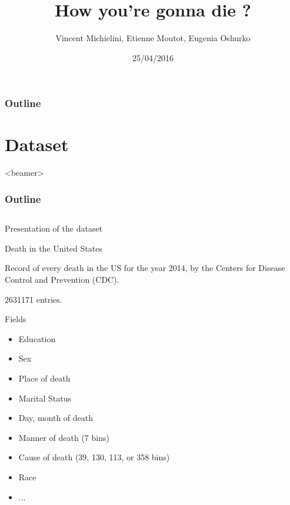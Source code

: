 \documentclass[xcolor=table]{beamer}
\title{How you're gonna die ?}
\author{Vincent Michielini, Etienne Moutot, Eugenia Oshurko}
\date{25/04/2016}
\begin{document}
\begin{frame}
\maketitle
\end{frame}

\begin{frame}
  \frametitle{Outline}
  \tableofcontents
\end{frame}

\section{Dataset}
{
     \begin{frame}<beamer>
     \frametitle{Outline}
     \tableofcontents[currentsection]
     \end{frame}
}

\subsection{}
\begin{frame}{Presentation of the dataset}
  \begin{center}
  {\Large Death in the United States}
  \end{center}
  
  \bigskip
  
  Record of every death in the US for the year 2014, by the  Centers for Disease Control and Prevention (CDC).
  
  \medskip
  
  2631171 entries.
\end{frame}

\begin{frame}{Fields}
  \begin{itemize}
    \item Education
    \item Sex
    \item Place of death
    \item Marital Status
    \item Day, month of death
    \item Manner of death (7 bins)
    \item Cause of death (39, 130, 113, or 358 bins)
    \item Race
    \item ...
  \end{itemize}
\end{frame}
\end{document}
